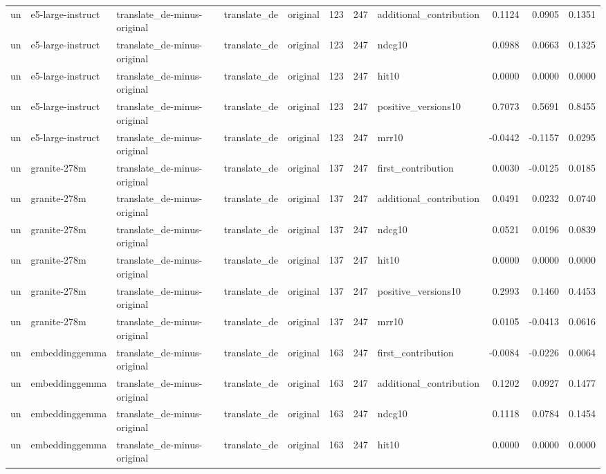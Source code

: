 \begin{tabular}{lllllrrlrrr}
un & e5-large-instruct & translate\_de-minus-original & translate\_de & original & 123 & 247 & additional\_contribution & 0.1124 & 0.0905 & 0.1351 \\
un & e5-large-instruct & translate\_de-minus-original & translate\_de & original & 123 & 247 & ndcg10 & 0.0988 & 0.0663 & 0.1325 \\
un & e5-large-instruct & translate\_de-minus-original & translate\_de & original & 123 & 247 & hit10 & 0.0000 & 0.0000 & 0.0000 \\
un & e5-large-instruct & translate\_de-minus-original & translate\_de & original & 123 & 247 & positive\_versions10 & 0.7073 & 0.5691 & 0.8455 \\
un & e5-large-instruct & translate\_de-minus-original & translate\_de & original & 123 & 247 & mrr10 & -0.0442 & -0.1157 & 0.0295 \\
un & granite-278m & translate\_de-minus-original & translate\_de & original & 137 & 247 & first\_contribution & 0.0030 & -0.0125 & 0.0185 \\
un & granite-278m & translate\_de-minus-original & translate\_de & original & 137 & 247 & additional\_contribution & 0.0491 & 0.0232 & 0.0740 \\
un & granite-278m & translate\_de-minus-original & translate\_de & original & 137 & 247 & ndcg10 & 0.0521 & 0.0196 & 0.0839 \\
un & granite-278m & translate\_de-minus-original & translate\_de & original & 137 & 247 & hit10 & 0.0000 & 0.0000 & 0.0000 \\
un & granite-278m & translate\_de-minus-original & translate\_de & original & 137 & 247 & positive\_versions10 & 0.2993 & 0.1460 & 0.4453 \\
un & granite-278m & translate\_de-minus-original & translate\_de & original & 137 & 247 & mrr10 & 0.0105 & -0.0413 & 0.0616 \\
un & embeddinggemma & translate\_de-minus-original & translate\_de & original & 163 & 247 & first\_contribution & -0.0084 & -0.0226 & 0.0064 \\
un & embeddinggemma & translate\_de-minus-original & translate\_de & original & 163 & 247 & additional\_contribution & 0.1202 & 0.0927 & 0.1477 \\
un & embeddinggemma & translate\_de-minus-original & translate\_de & original & 163 & 247 & ndcg10 & 0.1118 & 0.0784 & 0.1454 \\
un & embeddinggemma & translate\_de-minus-original & translate\_de & original & 163 & 247 & hit10 & 0.0000 & 0.0000 & 0.0000 \\

\end{tabular}
